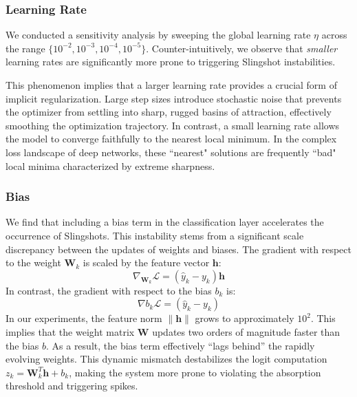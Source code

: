 \documentclass{article}
\theoremstyle{plain}
\theoremstyle{definition}
\theoremstyle{remark}
\begin{document}
\subsubsection{Learning Rate}
We conducted a sensitivity analysis by sweeping the global learning rate $\eta$ across the range $\{10^{-2}, 10^{-3}, 10^{-4}, 10^{-5}\}$. 
Counter-intuitively, we observe that \emph{smaller} learning rates are significantly more prone to triggering Slingshot instabilities.

This phenomenon implies that a larger learning rate provides a crucial form of implicit regularization. 
Large step sizes introduce stochastic noise that prevents the optimizer from settling into sharp, rugged basins of attraction, effectively smoothing the optimization trajectory. 
In contrast, a small learning rate allows the model to converge faithfully to the nearest local minimum. 
In the complex loss landscape of deep networks, these ``nearest" solutions are frequently ``bad" local minima characterized by extreme sharpness.


\subsubsection{Bias}
We find that including a bias term in the classification layer accelerates the occurrence of Slingshots. 
This instability stems from a significant scale discrepancy between the updates of weights and biases.
The gradient with respect to the weight $\boldsymbol{W}_k$ is scaled by the feature vector $\boldsymbol{h}$:
\begin{equation} 
    \nabla_{\boldsymbol{W}_k} \mathcal{L} = (\hat{y}_k - y_k)\boldsymbol{h} 
\end{equation}
In contrast, the gradient with respect to the bias $b_k$ is:
\begin{equation} 
    \nabla{b_k} \mathcal{L} = (\hat{y}_k - y_k) 
\end{equation}
In our experiments, the feature norm $\|\boldsymbol{h}\|$ grows to approximately $10^2$. 
This implies that the weight matrix $\boldsymbol{W}$ updates two orders of magnitude faster than the bias $b$. 
As a result, the bias term effectively ``lags behind'' the rapidly evolving weights. 
This dynamic mismatch destabilizes the logit computation $z_k = \boldsymbol{W}_k^T \boldsymbol{h} + b_k$, 
making the system more prone to violating the absorption threshold and triggering spikes.
\end{document}
